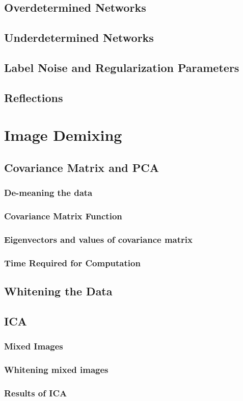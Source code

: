 \documentclass[11pt, oneside]{article}
\begin{document}
\subsection{Overdetermined Networks}

\subsection{Underdetermined Networks}

\subsection{Label Noise and Regularization Parameters}

\subsection{Reflections}

\section{Image Demixing}

\subsection{Covariance Matrix and PCA}

\subsubsection{De-meaning the data}

\subsubsection{Covariance Matrix Function}

\subsubsection{Eigenvectors and values of covariance matrix}

\subsubsection{Time Required for Computation}

\subsection{Whitening the Data}

\subsection{ICA}

\subsubsection{Mixed Images}

\subsubsection{Whitening mixed images}

\subsubsection{Results of ICA}
\end{document}

